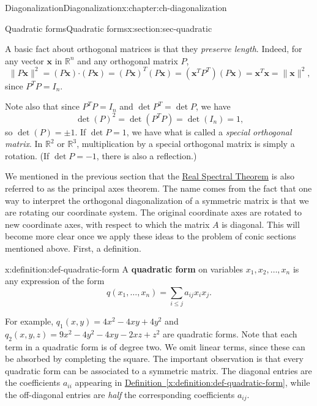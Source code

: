 \documentclass[oneside,10pt,]{book}
\newcommand{\xreffont}{\relax}
\newcommand{\terminology}[1]{\textbf{#1}}
\numberwithin{equation}{section}
\newcommand{\R}{\mathbb{R}}
\newcommand{\dotp}{\!\boldsymbol{\cdot}\!}
\newcommand{\len}[1]{\lVert #1\rVert}
\newcommand{\xx}{\mathbf{x}}
\begin{document}
\begin{chapterptx}{Diagonalization}{}{Diagonalization}{}{}{x:chapter:ch-diagonalization}
\begin{sectionptx}{Quadratic forms}{}{Quadratic forms}{}{}{x:section:sec-quadratic}
\par
A basic fact about orthogonal matrices is that they \emph{preserve length}. Indeed, for any vector \(\xx\) in \(\R^n\) and any orthogonal matrix \(P\),%
\begin{equation*}
\len{P\xx}^2 = (P\xx)\dotp (P\xx) = (P\xx)^T(P\xx) = (\xx^TP^T)(P\xx) = \xx^T\xx=\len{\xx}^2\text{,}
\end{equation*}
since \(P^TP=I_n\).%
\par
Note also that since \(P^TP=I_n\) and \(\det P^T=\det P\), we have%
\begin{equation*}
\det(P)^2=\det(P^TP)=\det(I_n)=1\text{,}
\end{equation*}
so \(\det(P)=\pm 1\). If \(\det P=1\), we have what is called a \emph{special orthogonal matrix}. In \(\R^2\) or \(\R^3\), multiplication by a special orthogonal matrix is simply a rotation. (If \(\det P=-1\), there is also a reflection.)%
\par
We mentioned in the previous section that the \hyperref[x:theorem:thm-real-spectral]{Real Spectral Theorem} is also referred to as the principal axes theorem. The name comes from the fact that one way to interpret the orthogonal diagonalization of a symmetric matrix is that we are rotating our coordinate system. The original coordinate axes are rotated to new coordinate axes, with respect to which the matrix \(A\) is diagonal. This will become more clear once we apply these ideas to the problem of conic sections mentioned above. First, a definition.%
\begin{definition}{}{x:definition:def-quadratic-form}%
A \terminology{quadratic form} on variables \(x_1, x_2,\ldots, x_n\) is any expression of the form%
\begin{equation*}
q(x_1,\ldots, x_n) = \sum_{i\leq j}a_{ij}x_ix_j\text{.}
\end{equation*}
%
\end{definition}
For example, \(q_1(x,y)=4 x^2-4xy+4y^2\) and \(q_2(x,y,z)=9x^2-4 y^2-4xy-2xz+z^2\) are quadratic forms. Note that each term in a quadratic form is of degree two. We omit linear terms, since these can be absorbed by completing the square. The important observation is that every quadratic form can be associated to a symmetric matrix. The diagonal entries are the coefficients \(a_{ii}\) appearing in \hyperref[x:definition:def-quadratic-form]{Definition~{\xreffont\ref{x:definition:def-quadratic-form}}}, while the off-diagonal entries are \emph{half} the corresponding coefficients \(a_{ij}\).%
\par

\end{sectionptx}
\end{chapterptx}
\end{document}
